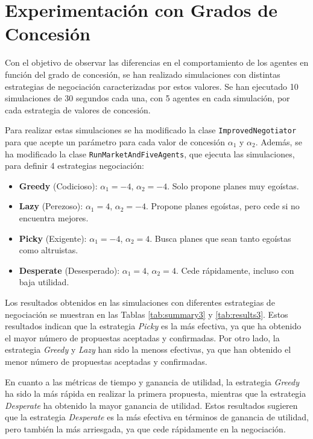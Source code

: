 \documentclass[12pt]{article}
\begin{document}
\newpage

\section{Experimentación con Grados de Concesión} \label{sec:ej3}

Con el objetivo de observar las diferencias en el comportamiento de los agentes en función del grado de concesión, se han realizado simulaciones con distintas estrategias de negociación caracterizadas por estos valores. Se han ejecutado 10 simulaciones de 30 segundos cada una, con 5 agentes en cada simulación, por cada estrategia de valores de concesión.

Para realizar estas simulaciones se ha modificado la clase \texttt{ImprovedNegotiator} para que acepte un parámetro para cada valor de concesión $\alpha_1$ y $\alpha_2$. Además, se ha modificado la clase \texttt{RunMarketAndFiveAgents}, que ejecuta las simulaciones, para definir 4 estrategias negociación:

\begin{itemize}
    \item \textbf{Greedy} (Codicioso): $\alpha_1 = -4$, $\alpha_2 = -4$. Solo propone planes muy egoístas.
    \item \textbf{Lazy} (Perezoso): $\alpha_1 = 4$, $\alpha_2 = -4$. Propone planes egoístas, pero cede si no encuentra mejores.
    \item \textbf{Picky} (Exigente): $\alpha_1 = -4$, $\alpha_2 = 4$. Busca planes que sean tanto egoístas como altruistas.
    \item \textbf{Desperate} (Desesperado): $\alpha_1 = 4$, $\alpha_2 = 4$. Cede rápidamente, incluso con baja utilidad.
\end{itemize}

Los resultados obtenidos en las simulaciones con diferentes estrategias de negociación se muestran en las Tablas \ref{tab:summary3} y \ref{tab:results3}. Estos resultados indican que la estrategia \textit{Picky} es la más efectiva, ya que ha obtenido el mayor número de propuestas aceptadas y confirmadas. Por otro lado, la estrategia \textit{Greedy} y \textit{Lazy} han sido la menoss efectivas, ya que han obtenido el menor número de propuestas aceptadas y confirmadas.

En cuanto a las métricas de tiempo y ganancia de utilidad, la estrategia \textit{Greedy} ha sido la más rápida en realizar la primera propuesta, mientras que la estrategia \textit{Desperate} ha obtenido la mayor ganancia de utilidad. Estos resultados sugieren que la estrategia \textit{Desperate} es la más efectiva en términos de ganancia de utilidad, pero también la más arriesgada, ya que cede rápidamente en la negociación.
\end{document}
